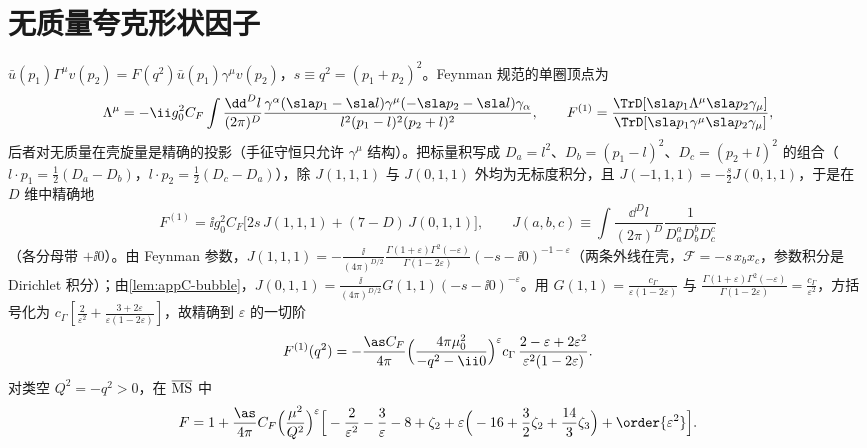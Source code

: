 \section{无质量夸克形状因子}\label{sec:appC-formfactor}

$\bar u(p_1)\Gamma^\mu v(p_2)=F(q^2)\bar u(p_1)\gamma^\mu v(p_2)$，$s\equiv q^2=(p_1+p_2)^2$。Feynman 规范的单圈顶点为
\[
\Lambda^\mu=-\ii g_0^2C_F\int\frac{\dd^Dl}{(2\pi)^D}\frac{\gamma^\alpha(\sla p_1-\sla l)\gamma^\mu(-\sla p_2-\sla l)\gamma_\alpha}{l^2(p_1-l)^2(p_2+l)^2},\qquad F^{(1)}=\frac{\TrD[\sla p_1\Lambda^\mu\sla p_2\gamma_\mu]}{\TrD[\sla p_1\gamma^\mu\sla p_2\gamma_\mu]},
\]
后者对无质量在壳旋量是精确的投影（手征守恒只允许 $\gamma^\mu$ 结构）。把标量积写成 $D_a=l^2$、$D_b=(p_1-l)^2$、$D_c=(p_2+l)^2$ 的组合（$l\cdot p_1=\frac12(D_a-D_b)$，$l\cdot p_2=\frac12(D_c-D_a)$），除 $J(1,1,1)$ 与 $J(0,1,1)$ 外均为无标度积分，且 $J(-1,1,1)=-\frac s2J(0,1,1)$，于是在 $D$ 维中精确地
\begin{equation}\label{eq:appC-ffred}
F^{(1)}=\ii g_0^2C_F\big[2s\,J(1,1,1)+(7-D)\,J(0,1,1)\big],\qquad J(a,b,c)\equiv\int\frac{\dd^Dl}{(2\pi)^D}\frac1{D_a^aD_b^bD_c^c}
\end{equation}
（各分母带 $+\ii0$）。由 Feynman 参数，$J(1,1,1)=-\frac{\ii}{(4\pi)^{D/2}}\frac{\Gamma(1+\varepsilon)\Gamma^2(-\varepsilon)}{\Gamma(1-2\varepsilon)}(-s-\ii0)^{-1-\varepsilon}$（两条外线在壳，$\mathcal F=-s\,x_bx_c$，参数积分是 Dirichlet 积分）；由\cref{lem:appC-bubble}，$J(0,1,1)=\frac{\ii}{(4\pi)^{D/2}}G(1,1)(-s-\ii0)^{-\varepsilon}$。用 $G(1,1)=\frac{c_\Gamma}{\varepsilon(1-2\varepsilon)}$ 与 $\frac{\Gamma(1+\varepsilon)\Gamma^2(-\varepsilon)}{\Gamma(1-2\varepsilon)}=\frac{c_\Gamma}{\varepsilon^2}$，方括号化为 $c_\Gamma[\frac2{\varepsilon^2}+\frac{3+2\varepsilon}{\varepsilon(1-2\varepsilon)}]$，故精确到 $\varepsilon$ 的一切阶
\begin{equation}\label{eq:appC-FF}
F^{(1)}(q^2)=-\frac{\as C_F}{4\pi}\Big(\frac{4\pi\mu_0^2}{-q^2-\ii0}\Big)^{\varepsilon}c_\Gamma\,\frac{2-\varepsilon+2\varepsilon^2}{\varepsilon^2(1-2\varepsilon)} .
\end{equation}
对类空 $Q^2=-q^2>0$，在 $\overline{\rm MS}$ 中
\begin{equation}\label{eq:appC-FFMS}
F=1+\frac{\as}{4\pi}C_F\Big(\frac{\mu^2}{Q^2}\Big)^{\varepsilon}\Big[-\frac2{\varepsilon^2}-\frac3\varepsilon-8+\zeta_2+\varepsilon\Big(-16+\frac32\zeta_2+\frac{14}3\zeta_3\Big)+\order{\varepsilon^2}\Big].
\end{equation}
